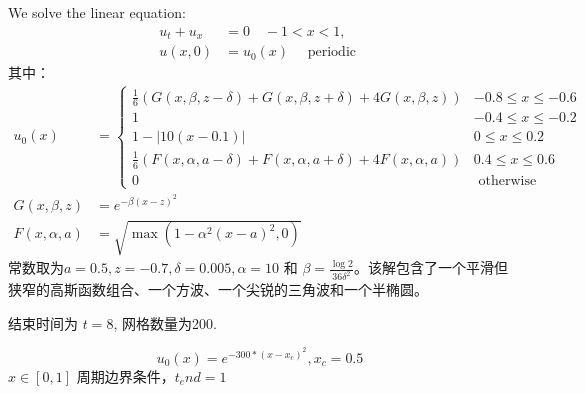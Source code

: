 \documentclass{book}
\begin{document}
\begin{example}
    We solve the linear equation\cite{RN56}:
    \begin{equation}
        \begin{aligned}
            u_{t}+u_{x} & =0 \quad-1<x<1,                    \\
            u(x, 0)     & =u_{0}(x) \quad \text { periodic }
        \end{aligned}
    \end{equation}
    其中：
    \begin{equation}
        \begin{aligned}
            u_{0}(x)        & =\begin{cases}
                                   \frac{1}{6}(G(x, \beta, z-\delta)+G(x, \beta, z+\delta)+4 G(x, \beta, z))    & -0.8 \leq x \leq-0.6 \\
                                   1                                                                            & -0.4 \leq x \leq-0.2 \\
                                   1-|10(x-0.1)|                                                                & 0 \leq x \leq 0.2    \\
                                   \frac{1}{6}(F(x, \alpha, a-\delta)+F(x, \alpha, a+\delta)+4 F(x, \alpha, a)) & 0.4 \leq x \leq 0.6  \\
                                   0                                                                            & \text { otherwise }
                               \end{cases} \\
            G(x, \beta, z)  & =e^{-\beta(x-z)^{2}}                                                                                 \\
            F(x, \alpha, a) & =\sqrt{\max \left(1-\alpha^{2}(x-a)^{2}, 0\right)}
        \end{aligned}
    \end{equation}
    常数取为$a=0.5, z=-0.7, \delta=0.005, \alpha=10$ 和 $\beta=\frac{\log 2}{36 \delta^{2}}$。该解包含了一个平滑但狭窄的高斯函数组合、一个方波、一个尖锐的三角波和一个半椭圆。

    结束时间为 $t=8$, 网格数量为200.
\end{example}
\begin{example}{}{}
    \cite{RN204}
    \begin{equation}
        u_0(x) = e^{-300*(x-x_c)^2},x_c=0.5
    \end{equation}
    $x\in[0,1]$ 周期边界条件，$t_end=1$
\end{example}
\end{document}
